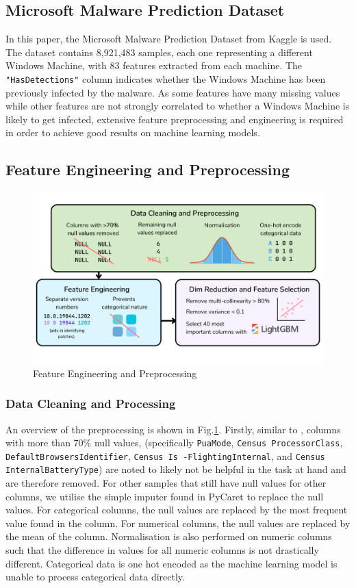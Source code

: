 \documentclass[pdflatex,sn-basic,Numbered]{sn-jnl}%
\theoremstyle{thmstyleone}%
\theoremstyle{thmstyletwo}%
\theoremstyle{thmstylethree}%
\begin{document}
\subsection{Microsoft Malware Prediction Dataset}
In this paper, the Microsoft Malware Prediction Dataset from Kaggle \cite{microsoft-malware-prediction} is used. The dataset contains 8,921,483 samples, each one representing a different Windows Machine, with 83 features extracted from each machine. The \texttt{"HasDetections"} column indicates whether the Windows Machine has been previously infected by the malware. As some features have many missing values while other features are not strongly correlated to whether a Windows Machine is likely to get infected, extensive feature preprocessing and engineering is required in order to achieve good results on machine learning models. 
\subsection{Feature Engineering and Preprocessing}
\begin{figure}[h]
\includegraphics[scale=0.25]{images/feature_engineering.png}
\centering
\caption{Feature Engineering and Preprocessing}
\label{Fig 2}
\end{figure}
\subsubsection{Data Cleaning and Processing} 
An overview of the preprocessing is shown in Fig.\ref{Fig 2}. Firstly, similar to \cite{shahini2019}, columns with more than 70\% null values, {(specifically \texttt{PuaMode}, \texttt{Census
ProcessorClass}, \texttt{DefaultBrowsersIdentifier}, \texttt{Census Is
-FlightingInternal}, and \texttt{Census InternalBatteryType})} are noted to likely not be helpful in the task at hand and are therefore removed. For other samples that still have null values for other columns, we utilise the simple imputer found in PyCaret to replace the null values. For categorical columns, the null values are replaced by the most frequent value found in the column. For numerical columns, the null values are replaced by the mean of the column. Normalisation is also performed on numeric columns such that the difference in values for all numeric columns is not drastically different. Categorical data is one hot encoded as the machine learning model is unable to process categorical data directly.
\end{document}

